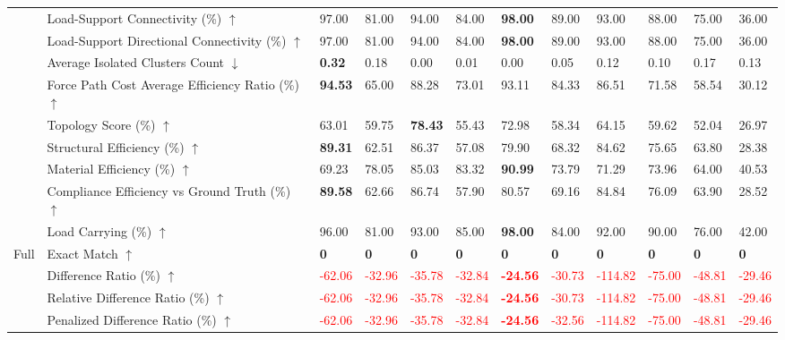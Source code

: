 \begin{table}[!h]
{\begin{tabular}{llllllllllll}
 & Load-Support Connectivity (\%) $\uparrow$ & 97.00 & 81.00 & 94.00 & 84.00 & \textbf{98.00} & 89.00 & 93.00 & 88.00 & 75.00 & 36.00 \\
 & Load-Support Directional Connectivity (\%) $\uparrow$ & 97.00 & 81.00 & 94.00 & 84.00 & \textbf{98.00} & 89.00 & 93.00 & 88.00 & 75.00 & 36.00 \\
 & Average Isolated Clusters Count $\downarrow$ & \textbf{0.32} & 0.18 & 0.00 & 0.01 & 0.00 & 0.05 & 0.12 & 0.10 & 0.17 & 0.13 \\
 & Force Path Cost Average Efficiency Ratio (\%) $\uparrow$ & \textbf{94.53} & 65.00 & 88.28 & 73.01 & 93.11 & 84.33 & 86.51 & 71.58 & 58.54 & 30.12 \\
 & Topology Score (\%) $\uparrow$ & 63.01 & 59.75 & \textbf{78.43} & 55.43 & 72.98 & 58.34 & 64.15 & 59.62 & 52.04 & 26.97 \\
 & Structural Efficiency (\%) $\uparrow$ & \textbf{89.31} & 62.51 & 86.37 & 57.08 & 79.90 & 68.32 & 84.62 & 75.65 & 63.80 & 28.38 \\
 & Material Efficiency (\%) $\uparrow$ & 69.23 & 78.05 & 85.03 & 83.32 & \textbf{90.99} & 73.79 & 71.29 & 73.96 & 64.00 & 40.53 \\
 & Compliance Efficiency vs Ground Truth (\%) $\uparrow$ & \textbf{89.58} & 62.66 & 86.74 & 57.90 & 80.57 & 69.16 & 84.84 & 76.09 & 63.90 & 28.52 \\
 & Load Carrying (\%) $\uparrow$ & 96.00 & 81.00 & 93.00 & 85.00 & \textbf{98.00} & 84.00 & 92.00 & 90.00 & 76.00 & 42.00 \\
Full & Exact Match $\uparrow$ & \textbf{0} & \textbf{0} & \textbf{0} & \textbf{0} & \textbf{0} & \textbf{0} & \textbf{0} & \textbf{0} & \textbf{0} & \textbf{0} \\
 & Difference Ratio (\%) $\uparrow$ & \textcolor{red}{-62.06} & \textcolor{red}{-32.96} & \textcolor{red}{-35.78} & \textcolor{red}{-32.84} & \textbf{\textcolor{red}{-24.56}} & \textcolor{red}{-30.73} & \textcolor{red}{-114.82} & \textcolor{red}{-75.00} & \textcolor{red}{-48.81} & \textcolor{red}{-29.46} \\
 & Relative Difference Ratio (\%) $\uparrow$ & \textcolor{red}{-62.06} & \textcolor{red}{-32.96} & \textcolor{red}{-35.78} & \textcolor{red}{-32.84} & \textbf{\textcolor{red}{-24.56}} & \textcolor{red}{-30.73} & \textcolor{red}{-114.82} & \textcolor{red}{-75.00} & \textcolor{red}{-48.81} & \textcolor{red}{-29.46} \\
 & Penalized Difference Ratio (\%) $\uparrow$ & \textcolor{red}{-62.06} & \textcolor{red}{-32.96} & \textcolor{red}{-35.78} & \textcolor{red}{-32.84} & \textbf{\textcolor{red}{-24.56}} & \textcolor{red}{-32.56} & \textcolor{red}{-114.82} & \textcolor{red}{-75.00} & \textcolor{red}{-48.81} & \textcolor{red}{-29.46} \\

\end{tabular}}
\end{table}
